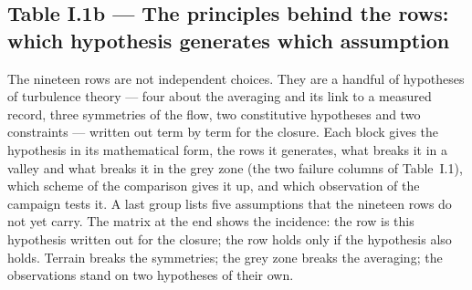 \subsection*{Table I.1b --- The principles behind the rows: which hypothesis generates which assumption}
{\footnotesize The nineteen rows are not independent choices. They are a handful of hypotheses of turbulence theory
--- four about the averaging and its link to a measured record, three symmetries of the flow, two constitutive
hypotheses and two constraints --- written out term by term for the closure. Each block gives the hypothesis in
its mathematical form, the rows it generates, what breaks it in a valley and what breaks it in the grey zone (the
two failure columns of Table~I.1), which scheme of the comparison gives it up, and which observation of the
campaign tests it. A last group lists five assumptions that the nineteen rows do not yet carry. The matrix at the
end shows the incidence: \pG{} the row is this hypothesis written out for the closure; \pL{} the row holds only if
the hypothesis also holds. Terrain breaks the symmetries; the grey zone breaks the averaging; the observations
stand on two hypotheses of their own. \par}
\vspace{0.5ex}
\scriptsize
\setlength{\tabcolsep}{3.5pt}
\renewcommand{\arraystretch}{1.1}
